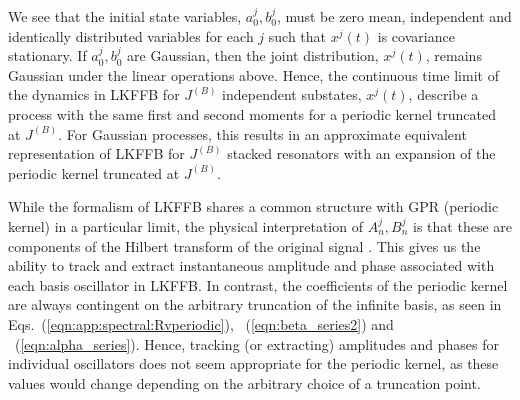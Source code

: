 We see that the initial state variables, $a^j_0, b^j_0$, must be zero mean, independent and identically distributed variables for each $j$ such that $x^j(t)$ is covariance stationary. If $a^j_0, b^j_0$ are Gaussian, then the joint distribution, $x^j(t)$, remains Gaussian under the linear operations above. Hence, the continuous time limit of the dynamics in LKFFB for $J^{(B)}$  independent substates, $x^j(t)$, describe a process with the same first and second moments for a periodic kernel truncated at $J^{(B)}$. For Gaussian processes, this results in an approximate equivalent representation of LKFFB for $J^{(B)}$ stacked resonators with an expansion of the periodic kernel truncated at $J^{(B)}$.

While the formalism of LKFFB shares a common structure with GPR (periodic kernel) in a particular limit, the  physical interpretation of $A^j_{n}, B^j_{n}$ is that these are components of the Hilbert transform of the original signal \cite{livska2007}. This gives us the ability to track and extract instantaneous amplitude and phase associated with each basis oscillator in LKFFB. In contrast, the coefficients of the periodic kernel are always contingent on the arbitrary truncation of the infinite basis, as seen in Eqs.~(\ref {eqn:app:spectral:Rvperiodic}),  ~(\ref {eqn:beta_series2}) and ~(\ref {eqn:alpha_series}). Hence, tracking (or extracting) amplitudes and phases for individual oscillators  does not seem appropriate for the periodic kernel, as these values would change depending on the arbitrary choice of a truncation point.  


\clearpage